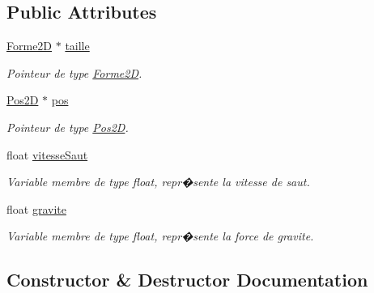\subsection*{Public Attributes}
\begin{DoxyCompactItemize}
\item 
\mbox{\label{classJoueur_af279ae8eb2013123c1adfbc81a0dd7b2}} 
\hyperlink{classForme2D}{Forme2D} $\ast$ \hyperlink{classJoueur_af279ae8eb2013123c1adfbc81a0dd7b2}{taille}
\begin{DoxyCompactList}\small\item\em Pointeur de type \hyperlink{classForme2D}{Forme2D}. \end{DoxyCompactList}\item 
\mbox{\label{classJoueur_a7ca4cf498c6c4748940e7f5751c0dab9}} 
\hyperlink{classPos2D}{Pos2D} $\ast$ \hyperlink{classJoueur_a7ca4cf498c6c4748940e7f5751c0dab9}{pos}
\begin{DoxyCompactList}\small\item\em Pointeur de type \hyperlink{classPos2D}{Pos2D}. \end{DoxyCompactList}\item 
\mbox{\label{classJoueur_a04722c946b2526f6819bbd1997b70a80}} 
float \hyperlink{classJoueur_a04722c946b2526f6819bbd1997b70a80}{vitesse\+Saut}
\begin{DoxyCompactList}\small\item\em Variable membre de type float, repr�sente la vitesse de saut. \end{DoxyCompactList}\item 
\mbox{\label{classJoueur_a53795b938406298f747e3736bf162449}} 
float \hyperlink{classJoueur_a53795b938406298f747e3736bf162449}{gravite}
\begin{DoxyCompactList}\small\item\em Variable membre de type float, repr�sente la force de gravite. \end{DoxyCompactList}\end{DoxyCompactItemize}


\subsection{Constructor \& Destructor Documentation}
\mbox{\label{classJoueur_add6c98be3020651d84f6d75ccc1d867e}} 
